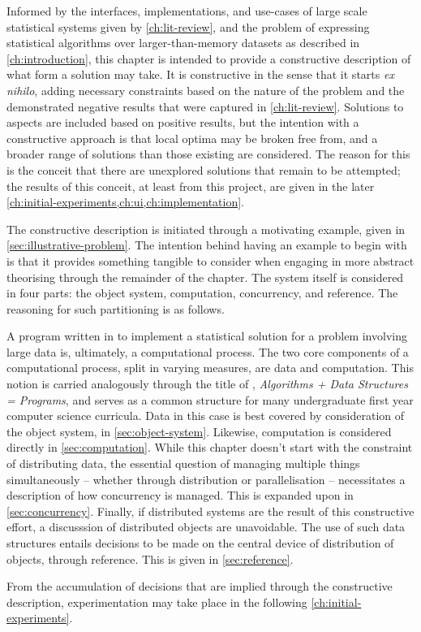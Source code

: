 Informed by the interfaces, implementations, and use-cases of large scale statistical systems given by \cref{ch:lit-review}, and the problem of expressing statistical algorithms over larger-than-memory datasets as described in \cref{ch:introduction}, this chapter is intended to provide a constructive description of what form a solution may take.
It is constructive in the sense that it starts \textit{ex nihilo}, adding necessary constraints based on the nature of the problem and the demonstrated negative results that were captured in \cref{ch:lit-review}.
Solutions to aspects are included based on positive results, but the intention with a constructive approach is that local optima may be broken free from, and a broader range of solutions than those existing are considered.
The reason for this is the conceit that there are unexplored solutions that remain to be attempted; the results of this conceit, at least from this project, are given in the later \cref{ch:initial-experiments,ch:ui,ch:implementation}.

The constructive description is initiated through a motivating example, given in \cref{sec:illustrative-problem}.
The intention behind having an example to begin with is that it provides something tangible to consider when engaging in more abstract theorising through the remainder of the chapter.
The system itself is considered in four parts: the object system, computation, concurrency, and reference.
The reasoning for such partitioning is as follows.

A program written in \R{} to implement a statistical solution for a problem involving large data is, ultimately, a computational process.
The two core components of a computational process, split in varying measures, are data and computation\cite{abelson1996structure}.
This notion is carried analogously through the title of \textcite{wirth1985algorithms}, \textit{Algorithms + Data Structures = Programs}, and serves as a common structure for many undergraduate first year computer science curricula.
Data in this case is best covered by consideration of the object system, in \cref{sec:object-system}.
Likewise, computation is considered directly in \cref{sec:computation}.
While this chapter doesn't start with the constraint of distributing data, the essential question of managing multiple things simultaneously -- whether through distribution or parallelisation -- necessitates a description of how concurrency is managed.
This is expanded upon in \cref{sec:concurrency}.
Finally, if distributed systems are the result of this constructive effort, a discusssion of distributed objects are unavoidable.
The use of such data structures entails decisions to be made on the central device of distribution of objects, through reference.
This is given in \cref{sec:reference}.

From the accumulation of decisions that are implied through the constructive description, experimentation may take place in the following \cref{ch:initial-experiments}.
